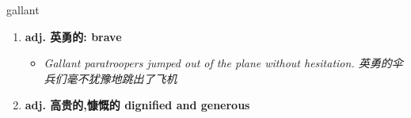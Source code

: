 
\begin{frame}
{\huge gallant}
\begin{center}
\begin{enumerate}\Large
  \item \textbf{adj. 英勇的: brave}
  \begin{itemize}
    \item \em{\Large{Gallant paratroopers jumped out of the plane without hesitation. 英勇的伞兵们毫不犹豫地跳出了飞机}}
  \end{itemize}
  \item \textbf{adj. 高贵的,慷慨的 dignified and generous}
\end{enumerate}
\end{center}
\end{frame}
